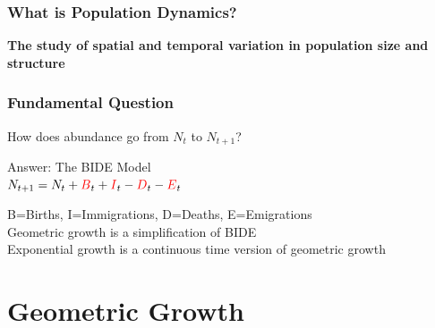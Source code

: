 \documentclass[color=usenames,dvipsnames]{beamer}\usepackage[]{graphicx}\usepackage[]{xcolor}
\begin{document}




\begin{frame}
  \frametitle{What is Population Dynamics?}
  {\centering \Large \bf The study of spatial and temporal variation in
    population size and structure \\ }
\end{frame}






\begin{frame}%
  \frametitle{Fundamental Question}
  \begin{center}
   { \Large How does abundance go from $N_t$ to $N_{t+1}$?} \par
   \vspace{1.5cm}
   \large
   \pause
   Answer: The {\color{red} BIDE} Model  \\
     $N_{t+1} = N_t + {\color{red}B}_t + {\color{red}I}_t - {\color{red}D}_t - {\color{red}E}_t$
  \vspace{2mm}
  \end{center}
  B=Births, I=Immigrations, D=Deaths, E=Emigrations \\
  \pause
  \vfill
  Geometric growth is a simplification of BIDE \\
  \pause
  \vfill
  Exponential growth is a continuous time version of geometric growth
\end{frame}



\section{Geometric Growth}



\end{document}
